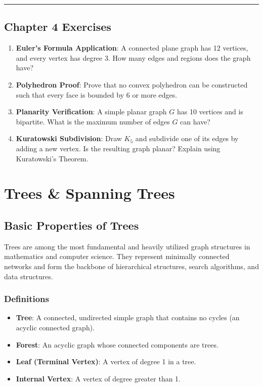 \documentclass[
]{book}
\providecommand{\tightlist}{%
  \setlength{\itemsep}{0pt}\setlength{\parskip}{0pt}}
\theoremstyle{definition}
\theoremstyle{definition}
\theoremstyle{definition}
\theoremstyle{definition}
\theoremstyle{remark}
\begin{document}
\begin{center}\rule{0.5\linewidth}{0.5pt}\end{center}

\section{Chapter 4 Exercises}\label{chapter-4-exercises}

\begin{enumerate}
\def\labelenumi{\arabic{enumi}.}
\tightlist
\item
  \textbf{Euler's Formula Application}: A connected plane graph has 12 vertices, and every vertex has degree 3. How many edges and regions does the graph have?
\item
  \textbf{Polyhedron Proof}: Prove that no convex polyhedron can be constructed such that every face is bounded by 6 or more edges.
\item
  \textbf{Planarity Verification}: A simple planar graph \(G\) has 10 vertices and is bipartite. What is the maximum number of edges \(G\) can have?
\item
  \textbf{Kuratowski Subdivision}: Draw \(K_5\) and subdivide one of its edges by adding a new vertex. Is the resulting graph planar? Explain using Kuratowski's Theorem.
\end{enumerate}

\chapter{Trees \& Spanning Trees}\label{trees-spanning-trees}

\section{Basic Properties of Trees}\label{basic-properties-of-trees}

Trees are among the most fundamental and heavily utilized graph structures in mathematics and computer science. They represent minimally connected networks and form the backbone of hierarchical structures, search algorithms, and data structures.

\subsection{Definitions}\label{definitions-2}

\begin{itemize}
\tightlist
\item
  \textbf{Tree}: A connected, undirected simple graph that contains no cycles (an acyclic connected graph).
\item
  \textbf{Forest}: An acyclic graph whose connected components are trees.
\item
  \textbf{Leaf (Terminal Vertex)}: A vertex of degree 1 in a tree.
\item
  \textbf{Internal Vertex}: A vertex of degree greater than 1.
\end{itemize}
\end{document}
